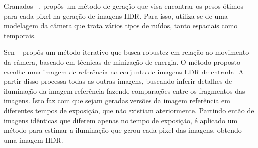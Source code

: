Granados \etal~\cite{granados}, propôs um método de geração que visa encontrar os pesos ótimos para cada pixel na geração de imagens HDR. Para isso, utiliza-se de uma modelagem da câmera que trata vários tipos de ruídos, tanto espaciais como temporais.


Sen \etal~\cite{hdrMovimento} propôs um método iterativo que busca robustez em relação ao movimento da câmera, baseado em técnicas de minização de energia. O método proposto escolhe uma imagem de referência no conjunto de imagens LDR de entrada. A partir disso processa todas as outras imagens, buscando inferir detalhes de iluminação da imagem referência fazendo comparações entre os fragmentos das imagens. Isto faz com que sejam geradas versões da imagem referência em diferentes tempos de exposição, que não existiam ateriormente. Partindo então de imagens idênticas que diferem apenas no tempo de exposição, é aplicado um método para estimar a iluminação que gerou cada pixel das imagens, obtendo uma imagem HDR.
